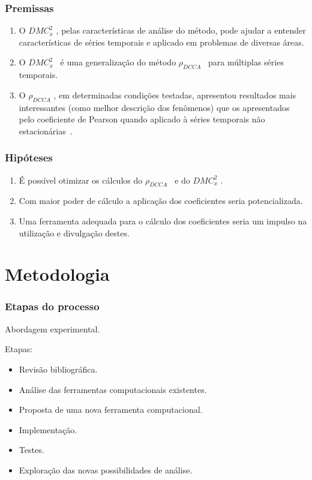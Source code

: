 \documentclass[11pt, aspectratio=169]{beamer}
\newcommand{\dmc}{\(DMC_x^2\) }
\newcommand{\pdcca}{\({\rho}_{DCCA}\) }
\begin{document}
\begin{frame}
  \frametitle{Premissas}

\begin{enumerate}
  \label{enum:premissas}

  \item O \dmc, pelas características de análise do método, pode ajudar a entender características de séries temporais e aplicado em problemas de diversas áreas.
  \item O \dmc~é uma generalização do método \pdcca~para múltiplas séries temporais.
	\item O \pdcca, em determinadas condições testadas, apresentou resultados mais interessantes (como melhor descrição dos fenômenos) que os apresentados pelo coeficiente de Pearson quando aplicado à séries temporais não estacionárias~\cite{Wang2013}. 
\end{enumerate}

\end{frame}

\begin{frame}
  \frametitle{Hipóteses}

\begin{enumerate}
    \item É possível otimizar os cálculos do \pdcca~e do \dmc.
    \item Com maior poder de cálculo a aplicação dos coeficientes seria potencializada.
	\item Uma ferramenta adequada para o cálculo dos coeficientes seria um impulso na utilização e divulgação destes.
\end{enumerate}

\end{frame}


\section{Metodologia}

\begin{frame}
\frametitle{Etapas do processo}
Abordagem experimental.

Etapas:
\begin{itemize}
  \item Revisão bibliográfica.
  \item Análise das ferramentas computacionais existentes.
  \item Proposta de uma nova ferramenta computacional.
  \item Implementação.
  \item Testes.
  \item Exploração das novas possibilidades de análise.
\end{itemize}

\end{frame}
\end{document}
